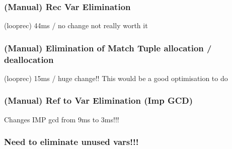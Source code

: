 \documentclass{report}
\begin{document}
\subsubsection*{(Manual) Rec Var Elimination}
(looprec) 44ms / no change not really worth it

\subsubsection*{(Manual) Elimination of Match Tuple allocation / deallocation}
(looprec) 15ms / huge change!! This would be a good optimisation to do

\subsubsection*{(Manual) Ref to Var Elimination (Imp GCD)}
Changes IMP gcd from 9ms to 3ms!!!

\subsubsection*{Need to eliminate unused vars!!!}
\end{document}
